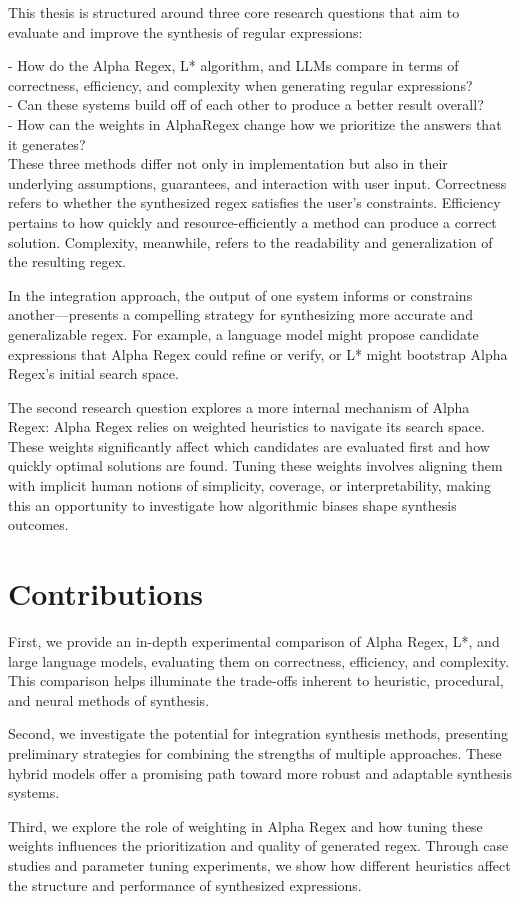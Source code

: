 \indent \indent This thesis is structured around three core research questions that aim to evaluate and improve the synthesis of regular expressions: 

- How do the Alpha Regex, L* algorithm, and LLMs compare in terms of correctness, efficiency, and complexity when generating regular expressions? \\
- Can these systems build off of each other to produce a better result overall? \\ 
- How can the weights in AlphaRegex change how we prioritize the answers that it generates? \\

\indent \indent These three methods differ not only in implementation but also in their underlying assumptions, guarantees, and interaction with user input. Correctness refers to whether the synthesized regex satisfies the user's constraints. Efficiency pertains to how quickly and resource-efficiently a method can produce a correct solution. Complexity, meanwhile, refers to the readability and generalization of the resulting regex.

\indent \indent In the integration approach, the output of one system informs or constrains another—presents a compelling strategy for synthesizing more accurate and generalizable regex. For example, a language model might propose candidate expressions that Alpha Regex could refine or verify, or L* might bootstrap Alpha Regex's initial search space. 

\indent \indent The second research question explores a more internal mechanism of Alpha Regex:  Alpha Regex relies on weighted heuristics to navigate its search space. These weights significantly affect which candidates are evaluated first and how quickly optimal solutions are found. Tuning these weights involves aligning them with implicit human notions of simplicity, coverage, or interpretability, making this an opportunity to investigate how algorithmic biases shape synthesis outcomes.

\vspace{-0.4em}
\section{Contributions}
\vspace{-0.4em}

First, we provide an in-depth experimental comparison of Alpha Regex, L*, and large language models, evaluating them on correctness, efficiency, and complexity. This comparison helps illuminate the trade-offs inherent to heuristic, procedural, and neural methods of synthesis.

\indent \indent Second, we investigate the potential for integration synthesis methods, presenting preliminary strategies for combining the strengths of multiple approaches. These hybrid models offer a promising path toward more robust and adaptable synthesis systems.

\indent \indent Third, we explore the role of weighting in Alpha Regex and how tuning these weights influences the prioritization and quality of generated regex. Through case studies and parameter tuning experiments, we show how different heuristics affect the structure and performance of synthesized expressions. 

